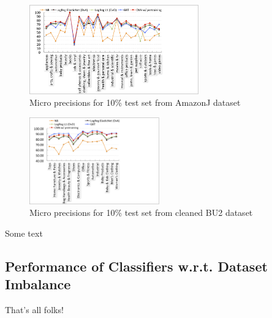\begin{figure}
	\vspace{-0.5cm}
	\centering
	\includegraphics[width=0.65\textwidth]{images/amazonj-WUC-predictions}
	\vspace{-0.4cm}
	\caption{Micro precisions for 10\% test set from AmazonJ dataset}
	\label{Figure_amazonj-WUC-predictions}
	\vspace{-0.4cm}
\end{figure}


\begin{figure}
	\vspace{-0.5cm}
	\centering
	\includegraphics[width=0.5\textwidth]{images/BU2-WUC-predictions}
	\vspace{-0.4cm}
	\caption{Micro precisions for 10\% test set from cleaned BU2 dataset}
	\label{Figure_BU2-WUC-predictions}
	\vspace{-0.4cm}
\end{figure}
Some text

\subsection{Performance of Classifiers w.r.t. Dataset Imbalance}
\label{Subsect:results>imbalance-performance-expectations}

That's all folks!
